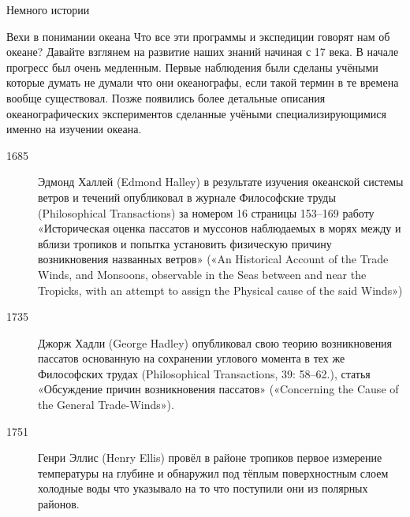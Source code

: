 \begin{chapter}{Немного истории}
\begin{section}{Вехи в понимании океана}
Что все эти программы и экспедиции говорят нам об океане? Давайте
взглянем на развитие наших знаний начиная с 17 века. В начале прогресс
был очень медленным. Первые наблюдения были сделаны учёными которые
думать не думали что они океанографы, если такой термин в те времена
вообще существовал. Позже появились более детальные описания
океанографических экспериментов сделанные учёными специализирующимися
именно на изучении океана. 





\begin{description}
\item[1685] Эдмонд Халлей (Edmond Halley) в результате изучения океанской
системы ветров и течений опубликовал в журнале Философские труды
(Philosophical Transactions) за номером 16 страницы 153--169 работу
«Историческая оценка пассатов и муссонов наблюдаемых в морях между и
вблизи тропиков и попытка установить физическую причину возникновения
названных ветров» («An Historical Account of the Trade Winds, and
Monsoons, observable in the Seas between and near the Tropicks, with
an attempt to assign the Physical cause of the said Winds»)

\item[1735] Джорж Хадли (George Hadley) опубликовал свою теорию возникновения
пассатов основанную на сохранении углового момента в тех же
Философских трудах (Philosophical Transactions, 39: 58–62.), статья
«Обсуждение причин возникновения пассатов» («Concerning the Cause of
the General Trade-Winds»).


\item[1751] Генри Эллис (Henry Ellis) провёл в районе тропиков первое
измерение температуры на глубине и обнаружил под тёплым поверхностным
слоем холодные воды что указывало на то что поступили они из полярных
районов.


\end{description}
\end{section}
\end{chapter}
